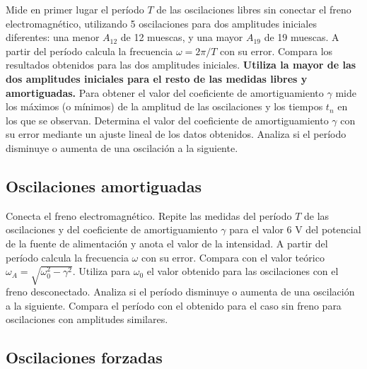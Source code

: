 \documentclass[11pt]{articulo}
\begin{document}
Mide en primer lugar el per\'iodo $T$ de las oscilaciones libres sin conectar el freno electromagn\'etico, utilizando 5 oscilaciones para dos amplitudes iniciales diferentes: una menor $A_{12}$ de 12 muescas, y una mayor $A_{19}$ de 19 muescas. A partir del per\'iodo calcula la frecuencia $\omega = 2\pi/T$ con su error. Compara los resultados obtenidos para las dos amplitudes iniciales. {\bf Utiliza la mayor de las dos amplitudes iniciales para el resto de las medidas libres y amortiguadas.} Para obtener el valor del coeficiente de amortiguamiento $\gamma$ mide los m\'aximos (o m\'inimos) de la amplitud de las oscilaciones y los tiempos $t_n$ en los que se observan. Determina el valor del coeficiente de amortiguamiento $\gamma$ con su error mediante un ajuste lineal de los datos obtenidos. Analiza si el per\'iodo disminuye o aumenta de una oscilaci\'on a la siguiente.

\subsection{Oscilaciones amortiguadas}

Conecta el freno electromagn\'etico. Repite las medidas del per\'iodo $T$ de las oscilaciones y del coeficiente de amortiguamiento $\gamma$ para el valor 6 V del potencial de la fuente de alimentaci\'on y anota el valor de la intensidad. A partir del per\'iodo calcula la frecuencia $\omega$ con su error. Compara con el valor te\'orico $\omega_A = \sqrt{\omega_0^2 - \gamma^2}$. Utiliza para $\omega_0$ el valor obtenido para las oscilaciones con el freno desconectado. Analiza si el per\'iodo disminuye o aumenta de una oscilaci\'on a la siguiente. Compara el per\'iodo con el obtenido para el caso sin freno para oscilaciones con amplitudes similares.

\subsection{Oscilaciones forzadas}
\end{document}
